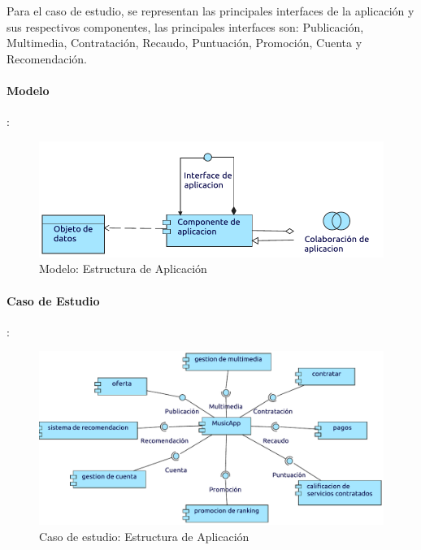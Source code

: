 Para el caso de estudio, se representan las principales interfaces de la aplicación y sus respectivos componentes, las principales interfaces son: Publicación, Multimedia, Contratación, Recaudo, Puntuación, Promoción, Cuenta y Recomendación. \vspace{\baselineskip}

\paragraph{Modelo}:
\begin{figure}[h!]
	\centering
	\includegraphics[width=\linewidth]{Desarrollo/ArquitecturaEmpresarial/Aplicacion/imgs/estructuraMetamodelo.pdf}
	\caption{Modelo: Estructura de Aplicación}
\end{figure}
\newpage
\paragraph{Caso de Estudio}:

\begin{figure}[h!]
	\centering
	\includegraphics[width=\linewidth]{Desarrollo/ArquitecturaEmpresarial/Aplicacion/imgs/estructura.pdf}
	\caption{Caso de estudio: Estructura de Aplicación }
\end{figure}


